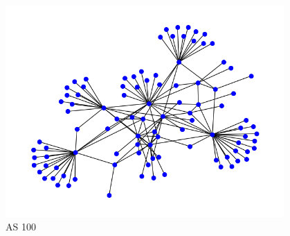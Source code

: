 \begin{figure}
    \begin{center}
        \includegraphics[width=0.95\textwidth]{Bilder/net_topo_as_100.png}
    \end{center}
    \caption{AS 100}
    \label{fig:as100}
\end{figure}

